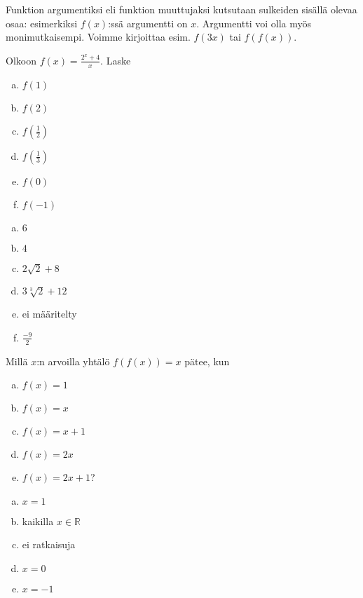 \begin{esimerkki}
Funktion argumentiksi eli funktion muuttujaksi kutsutaan sulkeiden sisällä olevaa osaa: esimerkiksi $f(x)$:ssä argumentti on $x$. Argumentti voi olla myös monimutkaisempi. Voimme kirjoittaa esim. $f(3x)$ tai $f(f(x))$.
\end{esimerkki}


\begin{tehtava}
Olkoon $f(x)=\frac{2^x+4}{x}$. Laske
\begin{enumerate}[a)]
\item $f(1)$
\item $f(2)$
\item $f(\frac{1}{2})$
\item $f(\frac{1}{3})$
\item $f(0)$
\item $f(-1)$
\end{enumerate}
\begin{vastaus}
\begin{enumerate}[a)]
\item $6$
\item $4$
\item $2\sqrt{2}+8$
\item $3\sqrt[3]{2}+12$
\item ei määritelty
\item $\frac{-9}{2}$
\end{enumerate}
\end{vastaus}
\end{tehtava}

\begin{tehtava}
Millä $x$:n arvoilla yhtälö $f(f(x)) = x$ pätee, kun
\begin{enumerate}[a)]
\item $f(x) = 1$
\item $f(x) = x$
\item $f(x) = x+1$
\item $f(x) = 2x$
\item $f(x) = 2x+1$?
\end{enumerate}
\begin{vastaus}
\begin{enumerate}[a)]
\item $x = 1$
\item kaikilla $x\in\mathbb{R}$
\item ei ratkaisuja
\item $x = 0$
\item $x = -1$
\end{enumerate}
\end{vastaus}
\end{tehtava}


